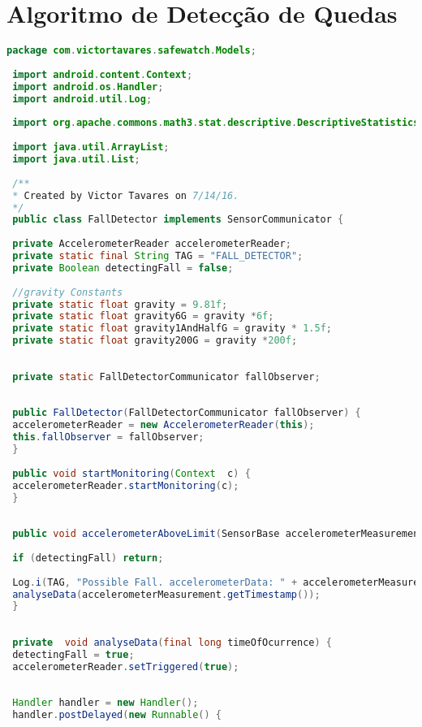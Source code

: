 \chapter{Algoritmo de Detecção de Quedas}
\label{ap:algorithm}


 \begin{lstlisting}[caption=Algoritmo de Detecção de Quedas em Java, label=cod:java, language=JAVA, frame=single, breaklines=true]
 package com.victortavares.safewatch.Models;
 
 import android.content.Context;
 import android.os.Handler;
 import android.util.Log;
 
 import org.apache.commons.math3.stat.descriptive.DescriptiveStatistics;
 
 import java.util.ArrayList;
 import java.util.List;
 
 /**
 * Created by Victor Tavares on 7/14/16.
 */
 public class FallDetector implements SensorCommunicator {
 
 private AccelerometerReader accelerometerReader;
 private static final String TAG = "FALL_DETECTOR";
 private Boolean detectingFall = false;
 
 //gravity Constants
 private static float gravity = 9.81f;
 private static float gravity6G = gravity *6f;
 private static float gravity1AndHalfG = gravity * 1.5f;
 private static float gravity200G = gravity *200f;
 
 
 private static FallDetectorCommunicator fallObserver;
 
 
 public FallDetector(FallDetectorCommunicator fallObserver) {
 accelerometerReader = new AccelerometerReader(this);
 this.fallObserver = fallObserver;
 }
 
 public void startMonitoring(Context  c) {
 accelerometerReader.startMonitoring(c);
 }
 
 
 public void accelerometerAboveLimit(SensorBase accelerometerMeasurement) {
 
 if (detectingFall) return;
 
 Log.i(TAG, "Possible Fall. accelerometerData: " + accelerometerMeasurement.getSpeed()/gravity + " at " + accelerometerMeasurement.getDate() + " on " + accelerometerMeasurement.getTimestamp());
 analyseData(accelerometerMeasurement.getTimestamp());
 }
 
 
 private  void analyseData(final long timeOfOcurrence) {
 detectingFall = true;
 accelerometerReader.setTriggered(true);
 
 
 Handler handler = new Handler();
 handler.postDelayed(new Runnable() {
 

\end{lstlisting}
